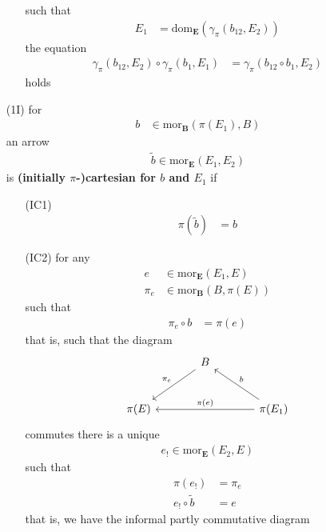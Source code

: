 \begin{enumerate}
\begin{enumerate}
such that
\begin{align*}
  E_{1}
  &=
  \mathrm{dom}_{\mathbf{E}}
  \left(
    \gamma_{\pi}(b_{12},E_{2})
  \right)
\end{align*}
the equation
\begin{align*}
  \gamma_{\pi}(b_{12},E_{2})
  \circ
  \gamma_{\pi}(b_{1},E_{1})
  &=
  \gamma_{\pi}(b_{12} \circ b_{1},E_{2})
\end{align*}
holds
\end{enumerate}
\item[(1I)]
for
\begin{align*}
  b
  &\in
  \mathrm{mor}_{\mathbf{B}}
  \left(
    \pi(E_{1}),
    B
  \right)
\end{align*}
an arrow
\begin{align*}
  \widetilde{b}
  \in
  \mathrm{mor}_{\mathbf{E}}(E_{1},E_{2})
\end{align*}
is \textbf{(initially $\pi$-)cartesian for $b$ and $E_{1}$} if
\begin{enumerate}
\item[(IC1)]
\begin{align*}
  \pi(\widetilde{b})
  &=
  b
\end{align*}
\item[(IC2)]
for any
\begin{align*}
  e
  &\in
  \mathrm{mor}_{\mathbf{E}}(E_{1},E)
  \\
  \pi_{e}
  &\in
  \mathrm{mor}_{\mathbf{B}}
  \left(
    B,
    \pi(E)
  \right)
\end{align*}
such that
\begin{align*}
  \pi_{e}
  \circ
  b
  &=
  \pi(e)
\end{align*}
that is, such that the diagram
\[
\begin{tikzcd}[sep=large]
  &
  B
  \arrow[swap]{dl}{\pi_{e}}
  &
  \\
  \pi(E)
  &
  &
  \pi(E_{1})
  \arrow[swap]{ll}{\pi(e)}
  \arrow[swap]{ul}{b}
\end{tikzcd}
\]
commutes there is a unique
\begin{align*}
  e_{!}
  \in
  \mathrm{mor}_{\mathbf{E}}(E_{2},E)
\end{align*}
such that
\begin{align*}
  \pi(e_{!})
  &=
  \pi_{e}
  \\
  e_{!}
  \circ
  \tilde{b}
  &=
  e
\end{align*}
that is, we have the informal partly commutative diagram
\[
\begin{tikzcd}[sep=large]
  &

\end{tikzcd}\]
\end{enumerate}
\end{enumerate}

